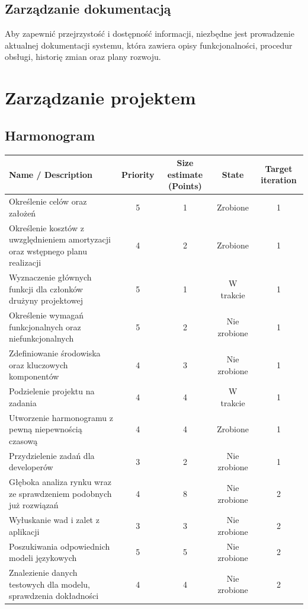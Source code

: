 \documentclass[a4paper, 12pt]{article}
\begin{document}
\subsection{Zarządzanie dokumentacją}

Aby zapewnić przejrzystość i dostępność informacji, niezbędne jest prowadzenie aktualnej dokumentacji systemu, która zawiera opisy funkcjonalności, procedur obsługi, historię zmian oraz plany rozwoju.
\newpage
\section{Zarządzanie projektem}
\subsection{Harmonogram}
\begin{center}
\footnotesize
\begin{tabular}{|p{}|c|c|c|c|}
\hline
\textbf{Name / Description} & \textbf{Priority} & \textbf{Size estimate (Points)} & \textbf{State} & \textbf{Target iteration} \\
\hline
Określenie celów oraz założeń & 5 & 1 & Zrobione & 1 \\
\hline
Określenie kosztów z uwzględnieniem amortyzacji oraz wstępnego planu realizacji & 4 & 2 & Zrobione & 1 \\
\hline
Wyznaczenie głównych funkcji dla członków drużyny projektowej & 5 & 1 & W trakcie & 1 \\
\hline
Określenie wymagań funkcjonalnych oraz niefunkcjonalnych & 5 & 2 & Nie zrobione & 1 \\
\hline
Zdefiniowanie środowiska oraz kluczowych komponentów & 4 & 3 & Nie zrobione & 1 \\
\hline
Podzielenie projektu na zadania & 4 & 4 & W trakcie & 1 \\
\hline
Utworzenie harmonogramu z pewną niepewnością czasową & 4 & 4 & Zrobione & 1 \\
\hline
Przydzielenie zadań dla developerów & 3 & 2 & Nie zrobione & 1 \\
\hline
Głęboka analiza rynku wraz ze sprawdzeniem podobnych już rozwiązań & 4 & 8 & Nie zrobione & 2 \\
\hline
Wyłuskanie wad i zalet z aplikacji & 3 & 3 & Nie zrobione & 2 \\
\hline
Poszukiwania odpowiednich modeli językowych & 5 & 5 & Nie zrobione & 2 \\
\hline
Znalezienie danych testowych dla modelu, sprawdzenia dokładności & 4 & 4 & Nie zrobione & 2 \\

\end{tabular}
\end{center}
\end{document}
